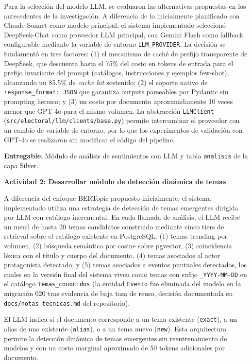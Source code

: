 Para la selección del modelo LLM, se evaluaron las alternativas propuestas en los antecedentes de la investigación. A diferencia de lo inicialmente planificado con Claude Sonnet como modelo principal, el sistema implementado seleccionó DeepSeek-Chat como proveedor LLM principal, con Gemini Flash como fallback configurable mediante la variable de entorno \texttt{LLM\_PROVIDER}. La decisión se fundamentó en tres factores: (1) el mecanismo de caché de prefijo transparente de DeepSeek, que descuenta hasta el 75\% del costo en tokens de entrada para el prefijo invariante del prompt (catálogos, instrucciones y ejemplos few-shot), alcanzando un 85.5\% de \textit{cache hit} sostenido; (2) el soporte nativo de \texttt{response\_format: JSON} que garantiza outputs parseables por Pydantic sin prompting heroico; y (3) un costo por documento aproximadamente 10 veces menor que GPT-4o para el mismo volumen. La abstracción \texttt{LLMClient} (\texttt{src/electoral/llm/clients/base.py}) permite intercambiar el proveedor con un cambio de variable de entorno, por lo que los experimentos de validación con GPT-4o se realizaron sin modificar el código del pipeline.
 
\textbf{Entregable}: Módulo de análisis de sentimientos con LLM y tabla \texttt{analisis} de la capa Silver.
 
\textbf{Actividad 2: Desarrollar módulo de detección dinámica de temas}
 
A diferencia del enfoque BERTopic propuesto inicialmente, el sistema implementado utiliza una estrategia de detección de temas emergentes dirigida por LLM con catálogo incremental. En cada llamada de análisis, el LLM recibe un menú de hasta 20 temas candidatos construido mediante cinco tiers de retrieval sobre el catálogo existente en PostgreSQL: (1) temas trending por volumen, (2) búsqueda semántica por cosine sobre pgvector, (3) coincidencia léxica con el título y cuerpo del documento, (4) temas asociados al actor protagonista detectado, y (5) temas asociados a eventos puntuales detectados, los cuales en la versión final del sistema viven como temas con sufijo \texttt{\_YYYY-MM-DD} en el catálogo \texttt{temas\_conocidos} (la entidad \texttt{Evento} fue eliminada del modelo en la migración 020 tras evidencia de baja tasa de reuso, decisión documentada en \texttt{docs/notas-tecnicas.md} del repositorio).

El LLM indica si el documento corresponde a un tema existente (\texttt{exact}), a un alias de uno existente (\texttt{alias}), o a un tema nuevo (\texttt{new}). Esta arquitectura permite la detección dinámica de temas emergentes sin reentrenamiento de modelos y con un costo marginal aproximado de 50 tokens adicionales por documento.

